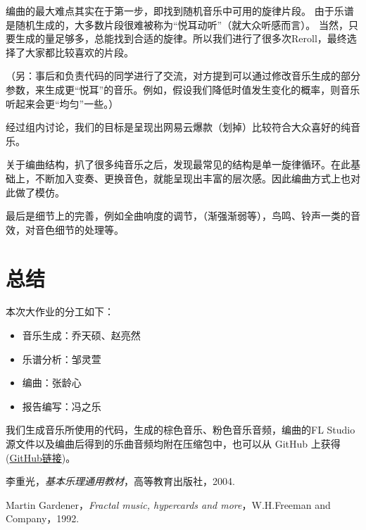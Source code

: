 \documentclass[a4paper,12pt]{article} %
\begin{document}
编曲的最大难点其实在于第一步，即找到随机音乐中可用的旋律片段。
由于乐谱是随机生成的，大多数片段很难被称为“悦耳动听”（就大众听感而言）。
当然，只要生成的量足够多，总能找到合适的旋律。所以我们进行了很多次Reroll，最终选择了大家都比较喜欢的片段。

（另：事后和负责代码的同学进行了交流，对方提到可以通过修改音乐生成的部分参数，来生成更“悦耳”的音乐。例如，假设我们降低时值发生变化的概率，则音乐听起来会更“均匀”一些。）

经过组内讨论，我们的目标是呈现出网易云爆款（划掉）比较符合大众喜好的纯音乐。

关于编曲结构，扒了很多纯音乐之后，发现最常见的结构是单一旋律循环。在此基础上，不断加入变奏、更换音色，就能呈现出丰富的层次感。因此编曲方式上也对此做了模仿。

最后是细节上的完善，例如全曲响度的调节，（渐强渐弱等），鸟鸣、铃声一类的音效，对音色细节的处理等。

\section{总结}
本次大作业的分工如下：
\begin{itemize}
    \item 音乐生成：乔天硕、赵亮然
    \item 乐谱分析：邹灵萱
    \item 编曲：张龄心
    \item 报告编写：冯之乐
\end{itemize}

我们生成音乐所使用的代码，生成的棕色音乐、粉色音乐音频，编曲的FL Studio源文件以及编曲后得到的乐曲音频均附在压缩包中，也可以从 GitHub 上获得(\href{https://github.com/lindseyzh/Music-and-Mathematics}{GitHub链接})。

\begin{thebibliography}{9}
 李重光，\emph{基本乐理通用教材}，高等教育出版社，2004.

 Martin Gardener，\emph{Fractal music, hypercards and more}，W.H.Freeman and Company，1992.

\end{thebibliography}
\end{document}
